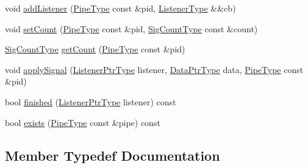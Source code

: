 \begin{DoxyCompactItemize}
\item 
void \hyperlink{structvt_1_1pipe_1_1signal_1_1_signal_holder_aee30c3b7c07d695450e1d6a9953ee98a}{add\+Listener} (\hyperlink{namespacevt_ac9852acda74d1896f48f406cd72c7bd3}{Pipe\+Type} const \&pid, \hyperlink{structvt_1_1pipe_1_1signal_1_1_signal_holder_a23af418129e6e8ecb4ee9621e6fd6f90}{Listener\+Type} \&\&cb)
\item 
void \hyperlink{structvt_1_1pipe_1_1signal_1_1_signal_holder_aa15cf43c4602a9d866f8060746696a45}{set\+Count} (\hyperlink{namespacevt_ac9852acda74d1896f48f406cd72c7bd3}{Pipe\+Type} const \&pid, \hyperlink{structvt_1_1pipe_1_1signal_1_1_signal_holder_aced54515f402b63f6dea174e5b027c81}{Sig\+Count\+Type} const \&count)
\item 
\hyperlink{structvt_1_1pipe_1_1signal_1_1_signal_holder_aced54515f402b63f6dea174e5b027c81}{Sig\+Count\+Type} \hyperlink{structvt_1_1pipe_1_1signal_1_1_signal_holder_aefb0dca5bdcb08b867c24b29f1d48429}{get\+Count} (\hyperlink{namespacevt_ac9852acda74d1896f48f406cd72c7bd3}{Pipe\+Type} const \&pid)
\item 
void \hyperlink{structvt_1_1pipe_1_1signal_1_1_signal_holder_a611fe4b2ce38900245e2f4a9dd40d5dc}{apply\+Signal} (\hyperlink{structvt_1_1pipe_1_1signal_1_1_signal_holder_a68114d1ad5804c71e014736b18e41e08}{Listener\+Ptr\+Type} listener, \hyperlink{structvt_1_1pipe_1_1signal_1_1_signal_holder_aad5bfc2b46dfa071ae638385324d7e31}{Data\+Ptr\+Type} data, \hyperlink{namespacevt_ac9852acda74d1896f48f406cd72c7bd3}{Pipe\+Type} const \&pid)
\item 
bool \hyperlink{structvt_1_1pipe_1_1signal_1_1_signal_holder_aa2d3f4de74295a26df20f26e84f99c4e}{finished} (\hyperlink{structvt_1_1pipe_1_1signal_1_1_signal_holder_a68114d1ad5804c71e014736b18e41e08}{Listener\+Ptr\+Type} listener) const
\item 
bool \hyperlink{structvt_1_1pipe_1_1signal_1_1_signal_holder_aeea971b494ab1e9bd716d4a127194ea3}{exists} (\hyperlink{namespacevt_ac9852acda74d1896f48f406cd72c7bd3}{Pipe\+Type} const \&pipe) const
\end{DoxyCompactItemize}


\subsection{Member Typedef Documentation}
\mbox{\label{structvt_1_1pipe_1_1signal_1_1_signal_holder_ade6904d6f651a864bf2e5a657a4b1a13}} 

